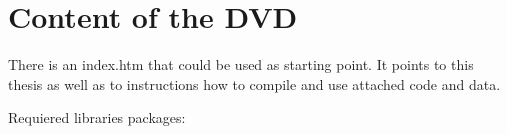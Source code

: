 \chapter{Content of the DVD}

There is an index.htm that could be used as starting point. It points to this
thesis as well as to instructions how to compile and use attached code and data.


Requiered libraries packages:




